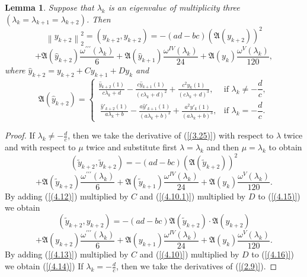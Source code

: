 \documentclass[10pt,a4paper]{amsart}
\newtheorem{lem}[thm]{Lemma}
\numberwithin{equation}{section}
\begin{document}
\begin{lem} Suppose that  $\lambda _{k}$ is an eigenvalue of multiplicity three \((\lambda_{k}=\lambda_{k+1} =\lambda_{k+2})\). Then
$$
 {\left\| {y_{k+2}} \right\|}^{2}_{2}=(y_{k+2},y_{k+2})=- (ad - bc)(\mathfrak{A}(y_{k+2}))^2
 $$
 \begin{equation}
 +\mathfrak{A}(\hat{y}_{k+2})\frac{\omega^{\prime\prime\prime}(\lambda_k)}{6}+
 \mathfrak{A}(\hat{y}_{k+1})\frac{\omega^{IV}(\lambda_k)}{24}+ \mathfrak{A}({y}_{k})\frac{\omega^{V}(\lambda_k)}{120},\label{(4.14)}
\end{equation}
where $\hat{y}_{k+2}={y}_{k+2}+Cy_{k+1}+Dy_k$ and
\begin{equation}
\mathfrak{A}(\hat{y}_{k+2}) =
\begin{cases}
\displaystyle  
\frac{\hat{y}_{k + 2}(1)}{c\lambda_{k} + d} - \frac{c\hat{y}_{k+1}(1)}{\left( c\lambda_{k} + d \right)^{2}}
+\frac{c^2y_{k}(1)}{\left( c\lambda_{k} + d \right)^{3}}, 
&  \text{if }  \lambda_k \neq -\dfrac{d}{c}, \\[10pt]
\displaystyle \ 
\frac{\hat{y}'_{k + 2}(1)}{a\lambda_{k} + b} - \frac{a\hat{y}'_{k+1}(1)}{\left( a\lambda_{k} + b \right)^{2}}
+\frac{a^2y'_{k}(1)}{\left( a\lambda_{k} + b\right)^{3}}, 
& \text{if } \lambda_k = -\dfrac{d}{c}.
\end{cases}\label{(4.14.1)}
\end{equation}
\end{lem}

\begin{proof}
If $\lambda _{k}\ne -\frac{d}{c}$, then
we take the derivative of (\ref{(3.25)}) with respect to $\lambda$  twice and with respect to $\mu$ twice and substitute first $\lambda=\lambda_k$ and then $\mu=\lambda_k$ to obtain 
$$
 (\tilde{y}_{k+2},\tilde{y}_{k+2})=- (ad - bc)(\mathfrak{A}(\tilde{y}_{k+2}))^2
 $$
 \begin{equation}
 +\mathfrak{A}(\tilde{y}_{k+2})\frac{\omega^{\prime\prime\prime}(\lambda_k)}{6}+
 \mathfrak{A}(\tilde{y}_{k+1})\frac{\omega^{IV}(\lambda_k)}{24}+ \mathfrak{A}({y}_{k})\frac{\omega^{V}(\lambda_k)}{120}.\label{(4.15)}
\end{equation}
By adding (\ref{(4.12)}) multiplied by $C$ and (\ref{(4.10.1)}) multiplied by $D$ to (\ref{(4.15)}) we obtain 
$$
 (\tilde{y}_{k+2},{y}_{k+2})=- (ad - bc)\mathfrak{A}(\tilde{y}_{k+2})\cdot\mathfrak{A}({y}_{k+2})
 $$
\begin{equation}
+\mathfrak{A}({y}_{k+2})\frac{\omega^{\prime\prime\prime}(\lambda_k)}{6}+ \mathfrak{A}({y}_{k+1})\frac{\omega^{IV}(\lambda_k)}{24}+\mathfrak{A}({y}_{k})\frac{\omega^{V}(\lambda_k)}{120}.\label{(4.16)}
\end{equation}
By adding (\ref{(4.13)}) multiplied by $C$ and (\ref{(4.10)}) multiplied by $D$ to (\ref{(4.16)}) we obtain (\ref{(4.14)})
If $\lambda _{k}=-\frac{d}{c}$, then we take the derivatives of (\ref{(2.9)}).
\end{proof}
\end{document}
